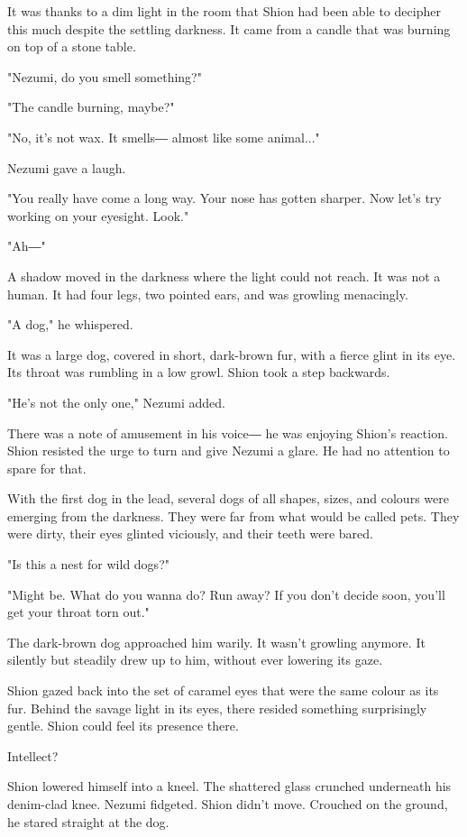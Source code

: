 It was thanks to a dim light in the room that Shion had been able to
decipher this much despite the settling darkness. It came from a candle
that was burning on top of a stone table.

"Nezumi, do you smell something?"

"The candle burning, maybe?"

"No, it's not wax. It smells― almost like some animal..."

Nezumi gave a laugh.

"You really have come a long way. Your nose has gotten sharper. Now
let's try working on your eyesight. Look."

"Ah―"

A shadow moved in the darkness where the light could not reach. It was
not a human. It had four legs, two pointed ears, and was growling
menacingly.

"A dog," he whispered.

It was a large dog, covered in short, dark-brown fur, with a fierce
glint in its eye. Its throat was rumbling in a low growl. Shion took a
step backwards.

"He's not the only one," Nezumi added.

There was a note of amusement in his voice― he was enjoying Shion's
reaction. Shion resisted the urge to turn and give Nezumi a glare. He
had no attention to spare for that.

With the first dog in the lead, several dogs of all shapes, sizes, and
colours were emerging from the darkness. They were far from what would
be called pets. They were dirty, their eyes glinted viciously, and their
teeth were bared.

"Is this a nest for wild dogs?"

"Might be. What do you wanna do? Run away? If you don't decide soon,
you'll get your throat torn out."

The dark-brown dog approached him warily. It wasn't growling anymore. It
silently but steadily drew up to him, without ever lowering its gaze.

Shion gazed back into the set of caramel eyes that were the same colour
as its fur. Behind the savage light in its eyes, there resided something
surprisingly gentle. Shion could feel its presence there.

Intellect?

Shion lowered himself into a kneel. The shattered glass crunched
underneath his denim-clad knee. Nezumi fidgeted. Shion didn't move.
Crouched on the ground, he stared straight at the dog.

